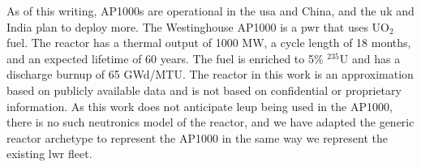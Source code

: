 As of this writing, AP1000s are operational in the \gls{usa} and China, and the \gls{uk} and India plan to deploy more. The Westinghouse AP1000 is a \gls{pwr} that uses UO$_2$ fuel. The reactor has a thermal output of 1000 MW, a cycle length of 18 months, and an expected lifetime of 60 years. The fuel is enriched to 5\% $^{235}$U and has a discharge burnup of 65 GWd/MTU. The reactor in this work is an approximation based on publicly available data and is not based on confidential or proprietary information. As this work does not anticipate \gls{leup} being used in the AP1000, there is no such neutronics model of the reactor, and we have adapted the generic \cycamore reactor archetype to represent the AP1000 in the same way we represent the existing \gls{lwr} fleet.
